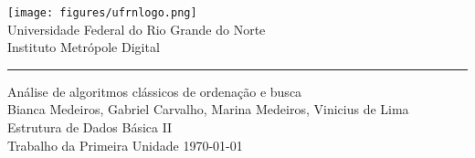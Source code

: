 \documentclass[a4paper,11pt,oneside]{book}
\begin{document}
    
    \frontmatter
    
    \begin{titlepage}      
        \begin{center}
            \texttt{[image: figures/ufrnlogo.png]}\\[0.5cm]
            {\LARGE Universidade Federal do Rio Grande do Norte\\[0.5cm]
            Instituto Metrópole Digital}\\[2cm]
			{\color{blue} \rule{\textwidth}{1pt}}
            \linespread{1.2}\huge {
                Análise de algoritmos clássicos de ordenação e busca
            }
            \linespread{1}~\\[2cm]
            {\Large 
              Bianca Medeiros,
              Gabriel Carvalho,
              Marina Medeiros,
              Vinicius de Lima
            }\\[1cm] 
            
            {\large 
                \emph{} Estrutura de Dados Básica II}\\[1cm] %
            
            \large Trabalho da Primeira Unidade
            \vfill
            \today 
        \end{center}
    \end{titlepage}
    
    
    \tableofcontents
    
    \mainmatter
    
\end{document}
